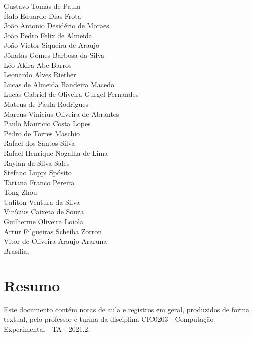 \documentclass[12pt]{book}
\begin{document}
\begin{titlepage}
\begin{center}
	Gustavo Tomás de Paula\\
	Ítalo Eduardo Dias Frota\\
	João Antonio Desidério de Moraes\\
	João Pedro Felix de Almeida\\
	João Víctor Siqueira de Araujo\\
	Jônatas Gomes Barbosa da Silva\\
	Léo Akira Abe Barros\\
	Leonardo Alves Riether\\
	Lucas de Almeida Bandeira Macedo\\
	Lucas Gabriel de Oliveira Gurgel Fernandes \\
	Mateus de Paula Rodrigues\\
	Marcus Vinicius Oliveira de Abrantes\\
	Paulo Mauricio Costa Lopes\\
	Pedro de Torres Maschio\\
	Rafael dos Santos Silva\\
	Rafael Henrique Nogalha de Lima\\
	Raylan da Silva Sales\\
	Stefano Luppi Spósito\\
	Tatiana Franco Pereira\\
	Tong Zhou\\
	Ualiton Ventura da Silva\\
	Vinícius Caixeta de Souza\\
	Guilherme Oliveira Loiola\\
	Artur Filgueiras Scheiba Zorron\\
	Vitor de Oliveira Araujo Araruna \\
	\vspace{1.5cm}
	{\large Brasília, \DTMnow}
\end{center}
\end{titlepage}
	\tableofcontents
	\listoffigures
	\listoftables
	\printnoidxglossary
	\clearpage
{}


	\chapter*{Resumo}

	Este documento contém notas de aula e registros em geral, produzidos de forma textual, pelo professor e turma da disciplina CIC0203 - Computação Experimental - TA - 2021.2.
	
\end{document}
